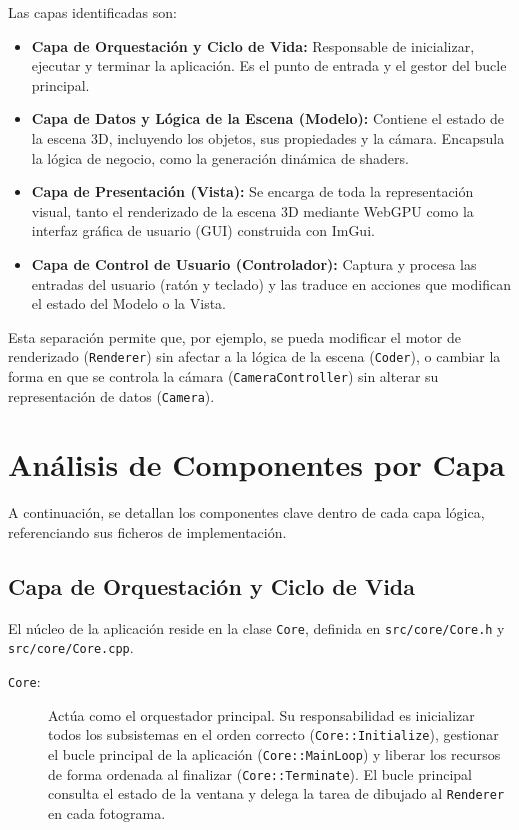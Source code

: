 Las capas identificadas son:

\begin{itemize}
    \item \textbf{Capa de Orquestación y Ciclo de Vida:} Responsable de inicializar, ejecutar y terminar la aplicación. Es el punto de entrada y el gestor del bucle principal.
    \item \textbf{Capa de Datos y Lógica de la Escena (Modelo):} Contiene el estado de la escena 3D, incluyendo los objetos, sus propiedades y la cámara. Encapsula la lógica de negocio, como la generación dinámica de shaders.
    \item \textbf{Capa de Presentación (Vista):} Se encarga de toda la representación visual, tanto el renderizado de la escena 3D mediante WebGPU como la interfaz gráfica de usuario (GUI) construida con ImGui.
    \item \textbf{Capa de Control de Usuario (Controlador):} Captura y procesa las entradas del usuario (ratón y teclado) y las traduce en acciones que modifican el estado del Modelo o la Vista.
\end{itemize}

Esta separación permite que, por ejemplo, se pueda modificar el motor de
renderizado (\texttt{Renderer}) sin afectar a la lógica de la escena
(\texttt{Coder}), o cambiar la forma en que se controla la cámara
(\texttt{CameraController}) sin alterar su representación de datos
(\texttt{Camera}).

\section{Análisis de Componentes por Capa}

A continuación, se detallan los componentes clave dentro de cada capa lógica,
referenciando sus ficheros de implementación.

\subsection{Capa de Orquestación y Ciclo de Vida}

El núcleo de la aplicación reside en la clase \texttt{Core}, definida en
\texttt{src/core/Core.h} y \texttt{src/core/Core.cpp}.

\begin{description}
    \item[\texttt{Core}:] Actúa como el orquestador principal. Su responsabilidad es inicializar todos los subsistemas en el orden correcto (\texttt{Core::Initialize}), gestionar el bucle principal de la aplicación (\texttt{Core::MainLoop}) y liberar los recursos de forma ordenada al finalizar (\texttt{Core::Terminate}). El bucle principal consulta el estado de la ventana y delega la tarea de dibujado al \texttt{Renderer} en cada fotograma.
\end{description}

